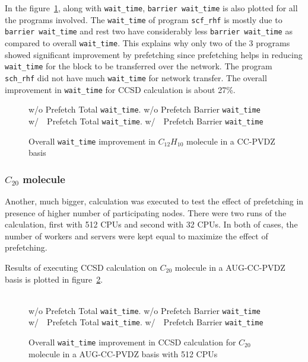 In the figure~\ref{fig:prefetch_real_barrier}, along with \texttt{wait\_time},
\texttt{barrier wait\_time} is also plotted for all the programs involved. The
\texttt{wait\_time} of program \texttt{scf\_rhf} is mostly due to \texttt{barrier wait\_time}
and rest two have considerably less \texttt{barrier wait\_time} as compared to
overall \texttt{wait\_time}. This explains why only two of the 3 programs showed
significant improvement by prefetching since prefetching helps in reducing \texttt{wait\_time}
for the block to be transferred over the network. The program \texttt{sch\_rhf} did not
have much \texttt{wait\_time} for network transfer. The overall improvement in
\texttt{wait\_time} for CCSD calculation is about 27\%.

\begin{figure}[h]
  
   w/o Prefetch Total \texttt{wait\_time}.
   w/o Prefetch Barrier \texttt{wait\_time}
  \\
   w/~~Prefetch Total \texttt{wait\_time}.
    w/~~Prefetch Barrier \texttt{wait\_time}
  \caption{Overall \texttt{wait\_time} improvement in $C_{12}H_{10}$ molecule in a CC-PVDZ basis}
  \label{fig:prefetch_real_barrier}
\end{figure}

\subsubsection{$C_{20}$ molecule}
Another, much bigger, calculation was executed to test the effect of prefetching
in presence of higher number of participating nodes. There were two runs of the
calculation, first with 512 CPUs and second with 32 CPUs. In both of cases, the
number of workers and servers were kept equal to maximize the effect of prefetching.

Results of executing CCSD calculation on $C_{20}$ molecule in a AUG-CC-PVDZ basis is
plotted in figure~\ref{fig:prefetch_real_256}.

\begin{figure}[h]
  
  \\
   w/o Prefetch Total \texttt{wait\_time}.
   w/o Prefetch Barrier \texttt{wait\_time}
  \\
   w/~~Prefetch Total \texttt{wait\_time}.
    w/~~Prefetch Barrier \texttt{wait\_time}
  \caption{Overall \texttt{wait\_time} improvement in CCSD calculation for $C_{20}$ molecule in a AUG-CC-PVDZ basis with 512 CPUs}
  \label{fig:prefetch_real_256}
\end{figure}

